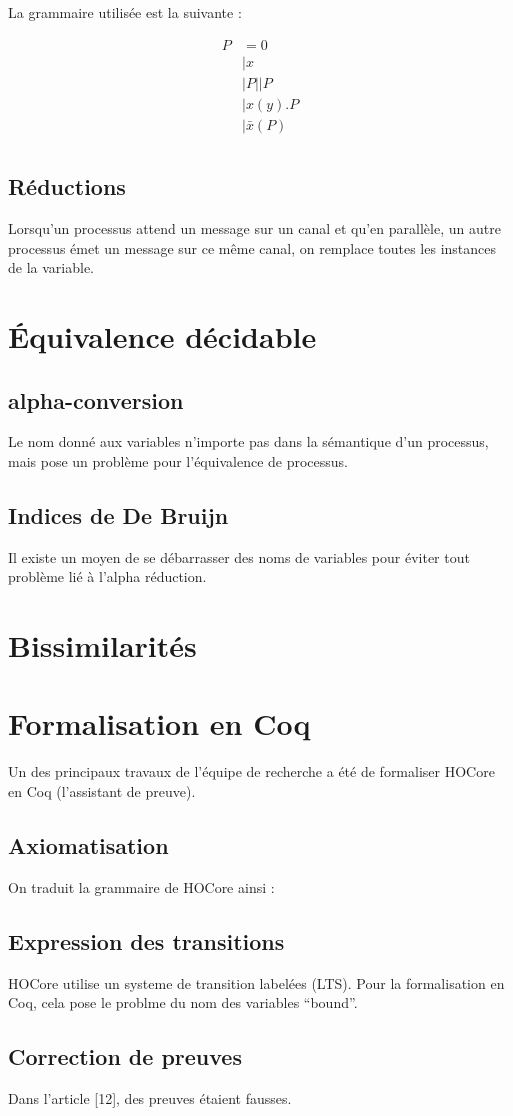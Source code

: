 \documentclass{article}
\begin{document}
La grammaire utilisée est la suivante :

\begin{align*}
P &= 0 \\
&| x \\
&| P||P\\
&| x(y).P\\
&| \bar{x}(P) \\
\end{align*}


\subsection{Réductions}
Lorsqu'un processus attend un message sur un canal et qu'en parallèle, un autre processus émet un message sur ce même canal, on remplace toutes les instances de la variable.




\section{Équivalence décidable}
\subsection{alpha-conversion}
Le nom donné aux variables n'importe pas dans la sémantique d'un processus, mais pose un problème pour l'équivalence de processus.

\subsection{Indices de De Bruijn}
Il existe un moyen de se débarrasser des noms de variables pour éviter tout problème lié à l'alpha réduction.
\section{Bissimilarités}



\section{Formalisation en Coq}
Un des principaux travaux de l'équipe de recherche a été de formaliser HOCore en Coq (l'assistant de preuve).

\subsection{Axiomatisation}
On traduit la grammaire de HOCore ainsi :

\subsection{Expression des transitions}
HOCore utilise un systeme de transition labelées (LTS). Pour la formalisation en Coq, cela pose le problme du nom des variables ``bound''.
\subsection{Correction de preuves}
Dans l'article [12], des preuves étaient fausses.
\end{document}

